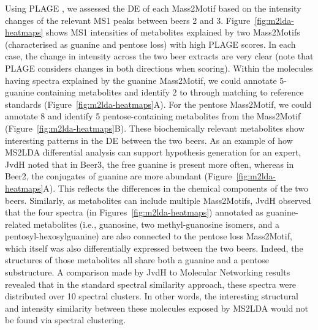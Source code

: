Using PLAGE \cite{tomfohr2005pathway}, we assessed the DE of each Mass2Motif based on the intensity changes of the relevant MS1 peaks between beers 2 and 3. Figure~\ref{fig:m2lda-heatmaps} shows MS1 intensities of metabolites explained by two Mass2Motifs (characterised as guanine and pentose loss) with high PLAGE scores. In each case, the change in intensity across the two beer extracts are very clear (note that PLAGE considers changes in both directions when scoring). Within the molecules having spectra explained by the guanine Mass2Motif, we could annotate 5-guanine containing metabolites and identify 2 to through matching to reference standards (Figure~\ref{fig:m2lda-heatmaps}A). For the pentose Mass2Motif, we could annotate 8 and identify 5 pentose-containing metabolites from the Mass2Motif (Figure~\ref{fig:m2lda-heatmaps}B). These biochemically relevant metabolites show interesting patterns in the DE between the two beers. As an example of how MS2LDA differential analysis can support hypothesis generation for an expert, JvdH noted that in Beer3, the free guanine is present more often, whereas in Beer2, the conjugates of guanine are more abundant (Figure~\ref{fig:m2lda-heatmaps}A). This reflects the differences in the chemical components of the two beers. Similarly, as metabolites can include multiple Mass2Motifs, JvdH observed that the four spectra (in Figures~\ref{fig:m2lda-heatmaps}) annotated as guanine-related metabolites (i.e., guanosine, two methyl-guanosine isomers, and a pentosyl-hexosylguanine) are also connected to the pentose loss Mass2Motif, which itself was also differentially expressed between the two beers. Indeed, the structures of those metabolites all share both a guanine and a pentose substructure. A comparison made by JvdH to Molecular Networking results revealed that in the standard spectral similarity approach, these spectra were distributed over 10 spectral clusters. In other words, the interesting structural and intensity similarity between these molecules exposed by MS2LDA would not be found via spectral clustering. 

